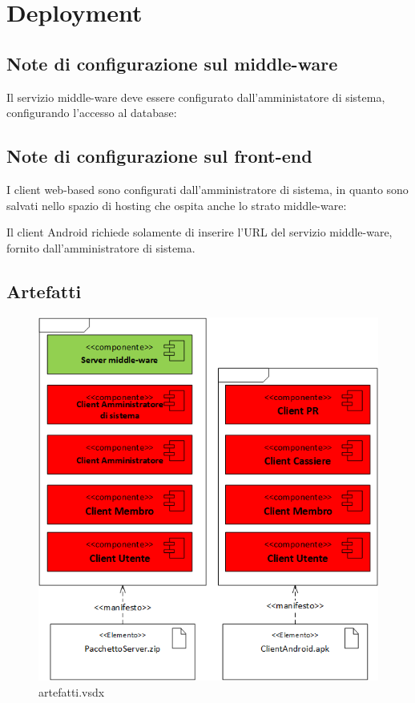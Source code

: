 \documentclass[a4paper]{article}
\begin{document}
\newpage

\section{Deployment}

\subsection{Note di configurazione sul middle-ware}

Il servizio middle-ware deve essere configurato dall'amministatore di sistema, configurando l'accesso al database:





\subsection{Note di configurazione sul front-end}

I client web-based sono configurati dall'amministratore di sistema, in quanto sono salvati nello spazio di hosting che ospita anche lo strato middle-ware:



Il client Android richiede solamente di inserire l'URL del servizio middle-ware, fornito dall'amministratore di sistema.

\subsection{Artefatti}


\begin{figure}[H]
    \includegraphics[scale=0.7]{Implementazione/artefatti.png}
    \centering
    \caption{artefatti.vsdx}
\end{figure}
\end{document}
